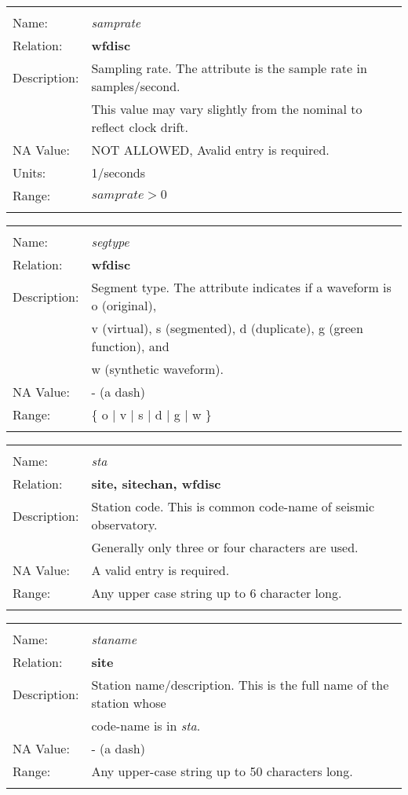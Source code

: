 \begin{tabular*}{6.5 in}{ll} \hline
\\
Name: & {\it samprate} \\
Relation: & {\bf wfdisc} \\
Description: & Sampling rate. The attribute is the sample rate in samples/second. \\
& This value may vary slightly from the nominal to reflect clock drift. \\
NA Value: & NOT ALLOWED, Avalid entry is required. \\
Units: & 1/seconds \\
Range: & $samprate > 0$ \\
&\\
\end{tabular*}
\begin{tabular*}{6.5 in}{ll} \hline
\\
Name: & {\it segtype} \\
Relation: & {\bf wfdisc} \\
Description: & Segment type. The attribute indicates if a waveform is o (original), \\
& v (virtual), s (segmented), d (duplicate), g (green function), and  \\
& w (synthetic waveform). \\
NA Value: & - (a dash) \\
Range: & \{ o $|$ v $|$ s $|$ d $|$ g $|$ w \}  \\
&\\
\end{tabular*}
\begin{tabular*}{6.5 in}{ll} \hline
\\
Name: & {\it sta} \\
Relation: & {\bf site, sitechan, wfdisc} \\
Description: & Station code. This is common code-name of seismic observatory. \\
& Generally only three or four characters are used. \\
NA Value: & A valid entry is required. \\
Range: & Any upper case string up to 6 character long. \\
&\\
\end{tabular*}
\begin{tabular*}{6.5 in}{ll} \hline
\\
Name: & {\it staname} \\
Relation: & {\bf site} \\
Description: & Station name/description. This is the full name of the station whose \\
& code-name is in {\it sta}. \\
NA Value: & - (a dash) \\
Range: & Any upper-case string up to 50 characters long. \\
&\\
\end{tabular*}
